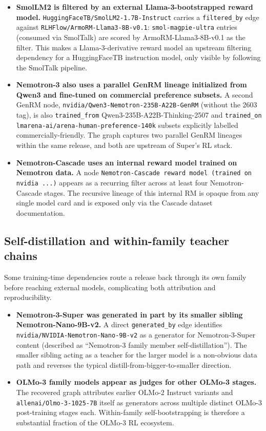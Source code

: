 \begin{itemize}
    \item \textbf{SmolLM2 is filtered by an external Llama-3-bootstrapped reward model.}
    \texttt{HuggingFaceTB/SmolLM2-1.7B-Instruct} carries a \texttt{filtered\_by} edge against \texttt{RLHFlow/ArmoRM-Llama3-8B-v0.1}: \texttt{smol-magpie-ultra} entries (consumed via SmolTalk) are scored by ArmoRM-Llama3-8B-v0.1 as the filter. This makes a Llama-3-derivative reward model an upstream filtering dependency for a HuggingFaceTB instruction model, only visible by following the SmolTalk pipeline.

    \item \textbf{Nemotron-3 also uses a parallel GenRM lineage initialized from Qwen3 and fine-tuned on commercial preference subsets.}
    A second GenRM node, \texttt{nvidia/Qwen3-Nemotron-235B-A22B-GenRM} (without the 2603 tag), is also \texttt{trained\_from} Qwen3-235B-A22B-Thinking-2507 and \texttt{trained\_on} \texttt{lmarena-ai/arena-human-preference-140k} subsets explicitly labelled commercially-friendly. The graph captures two parallel GenRM lineages within the same release, and both are upstream of Super's RL stack.

    \item \textbf{Nemotron-Cascade uses an internal reward model trained on Nemotron data.}
    A node \texttt{Nemotron-Cascade reward model (trained on nvidia ...)} appears as a recurring filter across at least four Nemotron-Cascade stages. The recursive lineage of this internal RM is opaque from any single model card and is exposed only via the Cascade dataset documentation.
\end{itemize}

\subsection{Self-distillation and within-family teacher chains}

Some training-time dependencies route a release back through its own family before reaching external models, complicating both attribution and reproducibility.

\begin{itemize}
    \item \textbf{Nemotron-3-Super was generated in part by its smaller sibling Nemotron-Nano-9B-v2.}
    A direct \texttt{generated\_by} edge identifies \texttt{nvidia/NVIDIA-Nemotron-Nano-9B-v2} as a generator for Nemotron-3-Super content (described as ``Nemotron-3 family member self-distillation''). The smaller sibling acting as a teacher for the larger model is a non-obvious data path and reverses the typical distill-from-bigger-to-smaller direction.

    \item \textbf{OLMo-3 family models appear as judges for other OLMo-3 stages.}
    The recovered graph attributes earlier OLMo-2 Instruct variants and \texttt{allenai/Olmo-3-1025-7B} itself as generators across multiple distinct OLMo-3 post-training stages each. Within-family self-bootstrapping is therefore a substantial fraction of the OLMo-3 RL ecosystem.
\end{itemize}

